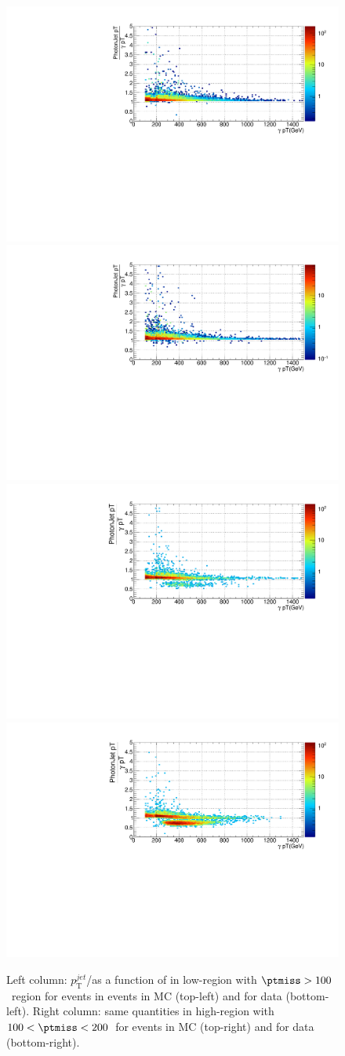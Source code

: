 \begin{figure}[h]
  \centering
  \includegraphics[width=0.48\linewidth]{../Figures/Chap2/appendix/RatioPhoJetPtToPhoPtVsPhoPt_AB_MultijetMC.pdf}
  \includegraphics[width=0.48\linewidth]{../Figures/Chap2/appendix/RatioPhoJetPtToPhoPtVsPhoPt_C_MultijetMC.pdf}
  \includegraphics[width=0.48\linewidth]{../Figures/Chap2/appendix/RatioPhoJetPtToPhoPtVsPhoPt_AB_data.pdf}
  \includegraphics[width=0.48\linewidth]{../Figures/Chap2/appendix/RatioPhoJetPtToPhoPtVsPhoPt_C_data.pdf}
  \caption[Data cleaning]{Left column: $p_{\text{T}}^{jet}$/\ptg as a function of \ptg in low-\dphi region with $\ptmiss>100$~\gev region for events in \gjets events in MC (top-left) and for data (bottom-left). Right column: same quantities in high-\dphi region with $100<\ptmiss<200$~\gev for \gjets events in MC (top-right) and for data (bottom-right). }
  \label{fig:ratioVsPhotonPt}
\end{figure}